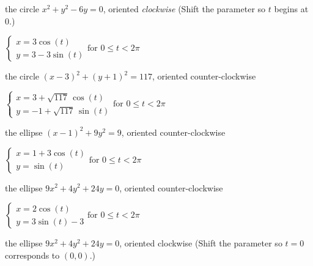 \documentclass{ximera}
\begin{document}
\begin{question}
\begin{problem} 
the circle $x^2 + y^2 - 6y = 0$, oriented \emph{clockwise} (Shift the parameter so  $t$ begins at $0$.)

\begin{solution}
${ \left\{ \begin{array}{l} x = 3\cos(t) \\ y = 3 - 3\sin(t)  \end{array} \right. \text{for } 0 \leq t < 2\pi }$
\end{solution}
\end{problem}

\begin{problem}
the circle $(x-3)^2 + (y+1)^2 = 117$, oriented counter-clockwise

\begin{solution}
${ \left\{ \begin{array}{l} x = 3+\sqrt{117} \, \cos(t) \\ y = -1 + \sqrt{117} \, \sin(t)  \end{array} \right. \text{for } 0 \leq t < 2\pi}$
\end{solution}
\end{problem}

\begin{problem}
the ellipse $(x-1)^2 + 9y^2 = 9$, oriented counter-clockwise

\begin{solution}
 ${ \left\{ \begin{array}{l} x = 1+3\cos(t) \\ y = \sin(t)  \end{array} \right. \text{for } 0 \leq t < 2\pi}$
\end{solution}
\end{problem}

\begin{problem}
 the ellipse $9x^2 + 4y^2 + 24y =0$, oriented counter-clockwise

 \begin{solution}
 ${ \left\{ \begin{array}{l} x = 2\cos(t) \\ y = 3\sin(t)-3  \end{array} \right. \text{for } 0 \leq t < 2\pi }$
 \end{solution}
 \end{problem}

\begin{problem}
  the ellipse $9x^2 + 4y^2 + 24y =0$, oriented clockwise  (Shift the parameter so $t=0$ corresponds to  $(0,0)$.)


\end{problem}
\end{question}
\end{document}
